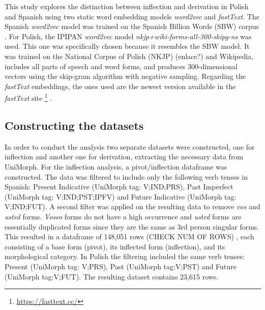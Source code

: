 \documentclass[12pt]{article}
\begin{document}
This study explores the distinction between inflection and derivation in Polish and Spanish using two static word embedding models \textit{word2vec} and \textit{fastText}. The Spanish \textit{word2vec} model was trained on the Spanish Billion Words (SBW) corpus \parencite{cardellino2016SpanishBillionWord}. For Polish, the IPIPAN \textit{word2vec} model \textit{nkjp+wiki-forms-all-300-skipg-ns} was used. This one was specifically chosen because it resembles the SBW model. It was trained on the National Corpus of Polish (NKJP) (enlace?) and Wikipedia, includes all parts of speech and word forms, and produces 300-dimensional vectors using the skip-gram algorithm with negative sampling. Regarding the \textit{fastText} embeddings, the ones used are the newest version available in the \textit{fastText} site \footnote{\url{https://fasttext.cc/}} \parencite{grave2018LearningWordVectors}.



\subsection{Constructing the datasets}

In order to conduct the analysis two separate datasets were constructed, one for inflection and another one for derivation, extracting the necessary data from UniMorph. For the inflection analysis, a pivot/inflection dataframe was constructed. The data was filtered to include only the following verb tenses in Spanish: Present Indicative (UniMorph tag: V;IND;PRS), Past Imperfect (UniMorph tag: V;IND;PST;IPFV) and Future Indicative (UniMorph tag: V;IND;FUT). A second filter was applied on the resulting data to remove \textit{vos} and \textit{usted} forms. \textit{Voseo} forms do not have a high occurrence and \textit{usted} forms are essentially duplicated forms since they are the same as 3rd person singular forms. This resulted in a dataframe of 148,051 rows (CHECK NUM OF ROWS) , each consisting of a base form (pivot), its inflected form (inflection), and its morphological category. In Polish the filtering included the same verb tenses: Present (UniMorph tag: V;PRS), Past (UniMorph tag:V;PST) and Future (UniMorph tag:V;FUT). The resulting dataset contains 23,615 rows. 
\end{document}
